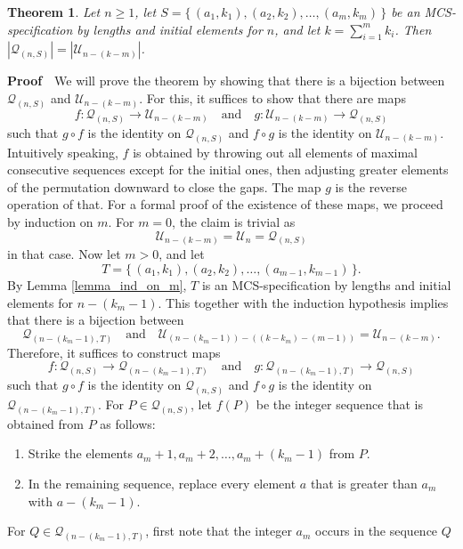 \documentclass{article}
\newtheorem{theorem}{Theorem}[section]
\def\proof{\par \noindent              %
\mbox{\bf Proof}\ \,}                  %
\begin{document}
\begin{theorem}\label{theorem_count_by_length_and_initial_element}
  Let $n \geq 1$, let $S = \{\,(a_1, k_1), (a_2, k_2), \ldots,(a_m, k_m)\,\}$ be an
  MCS-specification by lengths and initial elements for $n$, and let $k = \sum_{i=1}^m k_i$.
  Then $|{\mathcal Q}_{(n,S)}| = |{\mathcal U}_{n - (k - m)}|$.
\end{theorem}

\proof
We will prove the theorem by showing that there is a bijection between ${\mathcal Q}_{(n,S)}$
and ${\mathcal U}_{n - (k - m)}$. For this, it suffices to show that there are maps
$$
f: {\mathcal Q}_{(n,S)}\rightarrow {\mathcal U}_{n - (k - m)}
\quad\text{and}\quad 
g: {\mathcal U}_{n - (k - m)} \rightarrow {\mathcal Q}_{(n,S)}
$$
such that $g\circ f$ is the identity on ${\mathcal Q}_{(n,S)}$ and $f\circ g$ is the identity on
${\mathcal U}_{n - (k - m)}$. Intuitively speaking, $f$ is obtained by throwing out
all elements of maximal consecutive sequences except for the initial ones, then adjusting greater
elements of the permutation downward to close the gaps. The map $g$ is the reverse operation of that.
For a formal proof of the existence of these maps, we proceed by induction on $m$. For $m=0$,
the claim is trivial as $${\mathcal U}_{n - (k - m)} = {\mathcal U}_n = {\mathcal Q}_{(n,S)}$$
in that case. Now let $m>0$, and let
$$
T = \{\,(a_1, k_1), (a_2, k_2), \ldots,(a_{m-1}, k_{m-1})\,\}.
$$
By Lemma \ref{lemma_ind_on_m}, $T$ is an MCS-specification by lengths and initial elements
for $n - (k_m - 1)$. This together with the induction hypothesis implies
that there is a bijection between
$$
{\mathcal Q}_{(n-(k_m-1),T)}
\quad\text{and}\quad
{\mathcal U}_{(n-(k_m-1)) - ((k-k_m) - (m-1))} = {\mathcal U}_{n - (k - m)}.
$$
Therefore, it suffices to construct maps
$$
f: {\mathcal Q}_{(n,S)}\rightarrow {\mathcal Q}_{(n-(k_m-1),T)}
\quad\text{and}\quad 
g: {\mathcal Q}_{(n-(k_m-1),T)} \rightarrow {\mathcal Q}_{(n,S)}
$$
such that $g\circ f$ is the identity on ${\mathcal Q}_{(n,S)}$ and $f\circ g$ is the identity on
${\mathcal Q}_{(n-(k_m-1),T)}$.
For $P\in {\mathcal Q}_{(n,S)}$, let $f(P)$ be the integer sequence that is obtained from $P$ as follows:
\begin{enumerate}
\item
  Strike the elements $a_m + 1, a_m+2, \ldots, a_m+(k_m-1)$ from $P$.
\item
  In the remaining sequence, replace every element $a$ that is greater than $a_m$ with $a-(k_m-1)$.
\end{enumerate}
For $Q\in {\mathcal Q}_{(n-(k_m-1),T)}$, first note that the integer $a_m$ occurs in the sequence $Q$
\end{document}
